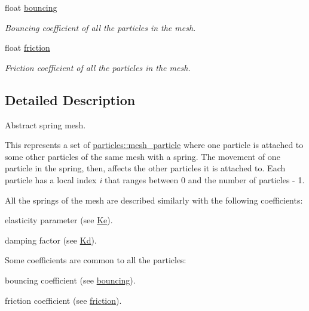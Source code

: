 \begin{DoxyCompactItemize}
\mbox{\label{classphysim_1_1meshes_1_1mesh_a90dc28ae4b66272d40615cb55596383a}} 
float \hyperlink{classphysim_1_1meshes_1_1mesh_a90dc28ae4b66272d40615cb55596383a}{bouncing}
\begin{DoxyCompactList}\small\item\em Bouncing coefficient of all the particles in the mesh. \end{DoxyCompactList}\item 
\mbox{\label{classphysim_1_1meshes_1_1mesh_a131fe4688049ea2ec62ef108aee1944c}} 
float \hyperlink{classphysim_1_1meshes_1_1mesh_a131fe4688049ea2ec62ef108aee1944c}{friction}
\begin{DoxyCompactList}\small\item\em Friction coefficient of all the particles in the mesh. \end{DoxyCompactList}\end{DoxyCompactItemize}


\subsection{Detailed Description}
Abstract spring mesh. 

This represents a set of \hyperlink{classphysim_1_1particles_1_1mesh__particle}{particles\+::mesh\+\_\+particle} where one particle is attached to some other particles of the same mesh with a spring. The movement of one particle in the spring, then, affects the other particles it is attached to. Each particle has a local index {\itshape i} that ranges between 0 and the number of particles -\/ 1.

All the springs of the mesh are described similarly with the following coefficients\+:
\begin{DoxyItemize}
\item elasticity parameter (see \hyperlink{classphysim_1_1meshes_1_1mesh_ab5afc13f5931c6a9df16d5ee49edc453}{Ke}).
\item damping factor (see \hyperlink{classphysim_1_1meshes_1_1mesh_abba546f70a90e7678efc5b746cf1ccd1}{Kd}).
\end{DoxyItemize}

Some coefficients are common to all the particles\+:
\begin{DoxyItemize}
\item bouncing coefficient (see \hyperlink{classphysim_1_1meshes_1_1mesh_a90dc28ae4b66272d40615cb55596383a}{bouncing}).
\item friction coefficient (see \hyperlink{classphysim_1_1meshes_1_1mesh_a131fe4688049ea2ec62ef108aee1944c}{friction}).
\end{DoxyItemize}

